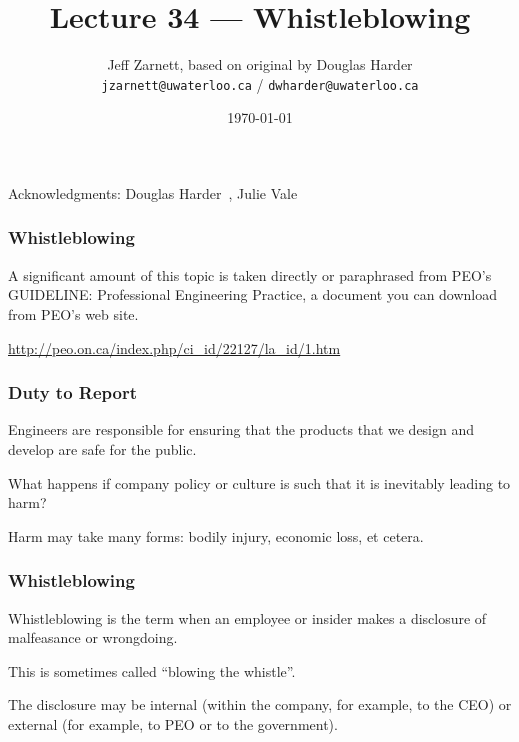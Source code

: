 

\title{Lecture 34 --- Whistleblowing }

\author{Jeff Zarnett, based on original by Douglas Harder \\ \small \texttt{jzarnett@uwaterloo.ca} / \texttt{dwharder@uwaterloo.ca}}
\date{\today}




\begin{frame}
  \titlepage

\begin{center}
  \small{Acknowledgments: Douglas Harder~\cite{dwh}, Julie Vale~\cite{jv}}
  \end{center}
\end{frame}



\begin{frame}
\frametitle{Whistleblowing}

A significant amount of this topic is taken directly or paraphrased from PEO's GUIDELINE:  Professional Engineering Practice, a document you can download from PEO's web site.

\url{http://peo.on.ca/index.php/ci_id/22127/la_id/1.htm}

\end{frame}



\begin{frame}
\frametitle{Duty to Report}

Engineers are responsible for ensuring that the products that we design and develop are safe for the public.

What happens if company policy or culture is such that it is inevitably leading to harm?

Harm may take many forms: bodily injury, economic loss, et cetera.

\end{frame}



\begin{frame}
\frametitle{Whistleblowing}

\alert{Whistleblowing} is the term when an employee or insider makes a disclosure of malfeasance or wrongdoing. 

This is sometimes called ``blowing the whistle''.

The disclosure may be internal (within the company, for example, to the CEO) or external (for example, to PEO or to the government).

\end{frame}



